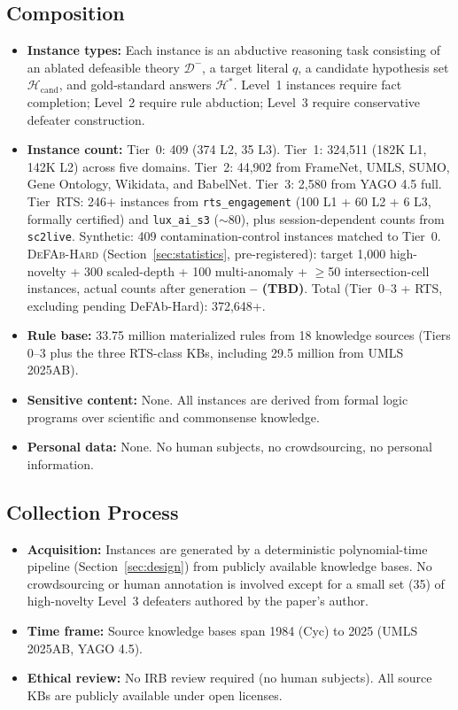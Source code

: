 \documentclass{article}
\theoremstyle{definition}
\newcommand{\Dm}{\mathcal{D}^{-}}
\newcommand{\Hcand}{\mathcal{H}_{\mathrm{cand}}}
\newcommand{\Hgold}{\mathcal{H}^{*}}
\begin{document}
\subsection*{Composition}

\begin{itemize}[nosep]
\item \textbf{Instance types:} Each instance is an abductive reasoning task consisting of an ablated defeasible theory $\Dm$, a target literal $q$, a candidate hypothesis set $\Hcand$, and gold-standard answers $\Hgold$. Level~1 instances require fact completion; Level~2 require rule abduction; Level~3 require conservative defeater construction.
\item \textbf{Instance count:} Tier~0: 409 (374 L2, 35 L3). Tier~1: 324,511 (182K L1, 142K L2) across five domains. Tier~2: 44,902 from FrameNet, UMLS, SUMO, Gene Ontology, Wikidata, and BabelNet. Tier~3: 2,580 from YAGO 4.5 full. Tier~RTS: 246+ instances from \texttt{rts\_engagement} (100 L1 + 60 L2 + 6 L3, formally certified) and \texttt{lux\_ai\_s3} ($\sim$80), plus session-dependent counts from \texttt{sc2live}. Synthetic: 409 contamination-control instances matched to Tier~0. \textsc{DeFAb-Hard} (Section~\ref{sec:statistics}, pre-registered): target 1{,}000 high-novelty + 300 scaled-depth + 100 multi-anomaly + $\geq$50 intersection-cell instances, actual counts after generation \textbf{-- (TBD)}. Total (Tier~0--3 + RTS, excluding pending DeFAb-Hard): 372,648+.
\item \textbf{Rule base:} 33.75 million materialized rules from 18 knowledge sources (Tiers 0--3 plus the three RTS-class KBs, including 29.5 million from UMLS 2025AB).
\item \textbf{Sensitive content:} None. All instances are derived from formal logic programs over scientific and commonsense knowledge.
\item \textbf{Personal data:} None. No human subjects, no crowdsourcing, no personal information.
\end{itemize}

\subsection*{Collection Process}

\begin{itemize}[nosep]
\item \textbf{Acquisition:} Instances are generated by a deterministic polynomial-time pipeline (Section~\ref{sec:design}) from publicly available knowledge bases. No crowdsourcing or human annotation is involved except for a small set (35) of high-novelty Level~3 defeaters authored by the paper's author.
\item \textbf{Time frame:} Source knowledge bases span 1984 (Cyc) to 2025 (UMLS 2025AB, YAGO 4.5).
\item \textbf{Ethical review:} No IRB review required (no human subjects). All source KBs are publicly available under open licenses.
\end{itemize}
\end{document}
